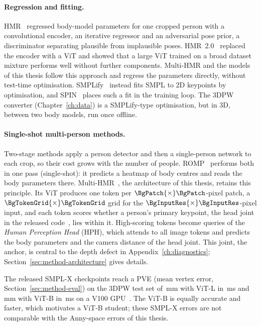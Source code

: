 \paragraph{Regression and fitting.}
HMR~\cite{kanazawa2018hmr} regressed body-model parameters for one cropped person with a convolutional encoder, an
iterative regressor and an adversarial pose prior, a discriminator separating plausible from implausible poses.
HMR~2.0~\cite{goel2023humans4d} replaced the encoder with a ViT and showed that a large ViT trained on a broad dataset
mixture performs well without further components. Multi-HMR and the models of this thesis follow this approach and
regress the parameters directly, without test-time optimisation. SMPLify~\cite{bogo2016smplify} instead fits SMPL to
2D keypoints by optimisation, and SPIN~\cite{kolotouros2019spin} places such a fit in the training loop. The 3DPW
converter (Chapter~\ref{ch:data}) is a SMPLify-type optimisation, but in 3D, between two body models, run once offline.

\paragraph{Single-shot multi-person methods.}
Two-stage methods apply a person detector and then a single-person network to each crop, so their cost grows with the
number of people. ROMP~\cite{sun2021romp} performs both in one pass (single-shot): it predicts a heatmap of body centres
and reads the body parameters there. Multi-HMR~\cite{baradel2024multihmr}, the architecture of this thesis, retains
this principle. Its ViT produces one token per $\BgPatch{\times}\BgPatch$-pixel patch, a
$\BgTokenGrid{\times}\BgTokenGrid$ grid for the $\BgInputRes{\times}\BgInputRes$-pixel input, and each token scores
whether a person's primary keypoint, the head joint in the released code~\cite{naver2024multihmrcode}, lies within it.
High-scoring tokens become queries of the \emph{Human Perception Head} (HPH), which attends to all image tokens and
predicts the body parameters and the camera distance of the head joint. This joint, the anchor, is central to the depth
defect in Appendix~\ref{ch:diagnostics}; Section~\ref{sec:method-architecture} gives details.

The released SMPL-X checkpoints reach a PVE (mean vertex error, Section~\ref{sec:method-eval}) on the 3DPW test set of
\BgMhrLPVE\,mm with ViT-L in \BgMhrLMs\,ms and \BgMhrBPVE\,mm with ViT-B in \BgMhrBMs\,ms on a V100
GPU~\cite{naver2024multihmrcode}. The ViT-B is equally accurate and faster, which motivates a ViT-B student; these
SMPL-X errors are not comparable with the Anny-space errors of this thesis.

